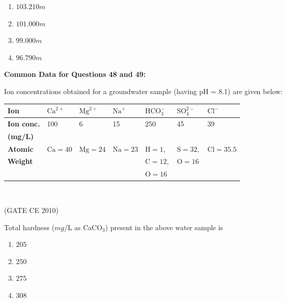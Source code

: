     \begin{multicols}{4}
        \begin{enumerate}
            \item $103.210 m$
            \item $101.000 m$
            \item $99.000 m$
            \item $96.790 m$
        \end{enumerate}
    \end{multicols}


    \textbf{Common Data for Questions 48 and 49:}

    Ion concentrations obtained for a groundwater sample (having pH = 8.1) are given below:

    \begin{table}[h!]
        \begin{center}
            \begin{tabular}{|l|l|l|l|l|l|l|}
                \hline
                \textbf{Ion} & $\text{Ca}^{2+}$ & $\text{Mg}^{2+}$ & $\text{Na}^+$ & $\text{HCO}_3^-$ & $\text{SO}_4^{2-}$ & $\text{Cl}^-$ \\ \hline
                \textbf{Ion conc.} & 100 & 6 & 15 & 250 & 45 & 39 \\ 
                \textbf{(mg/L)} & & & & & & \\
                \hline
                \textbf{Atomic} & $\text{Ca} = 40$ & $\text{Mg} = 24$ & $\text{Na} = 23$ & $\text{H} = 1,$ & $\text{S} = 32,$ & $\text{Cl} = 35.5$ \\
                \textbf{Weight} & & & & $\text{C} = 12,$ &  $\text{O} = 16$  & \\
                & & & & $\text{O} = 16$ & & \\ \hline
            \end{tabular}\\
        \end{center}
    \end{table} \hfill (GATE CE 2010)

    
    \item Total hardness ($mg$/L as CaCO$_3$) present in the above water sample is 

    \begin{multicols}{4}
        \begin{enumerate}
            \item $205$
            \item $250$
            \item $275$
            \item $308$
        \end{enumerate}
    \end{multicols}

